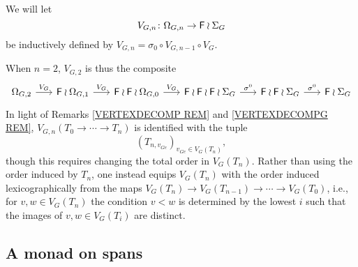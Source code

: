 \documentclass[a4paper,10pt]{article}%
\begin{document}
\begin{notation}\label{INDVNG NOT}
  We will let 
  \[
  V_{G,n} \colon \Omega_{G,n} \to \mathsf{F} \wr \Sigma_G
  \]
  be inductively defined by 
  $V_{G,n} = \sigma_0 \circ V_{G,n-1} \circ V_G$.
\end{notation}

\begin{remark}
  When $n = 2$, $V_{G,2}$ is thus the composite
  \[
  \begin{tikzcd}[column sep =1.7em]
    \Omega_{G,2} \ar{r}{V_G} &
    \Fin \wr \Omega_{G,1} \ar{r}{V_G} &
    \Fin \wr \Fin \wr \Omega_{G,0} \ar{r}{V_G} &
    \Fin \wr \Fin \wr \Fin \wr \Sigma_{G} \ar{r}{\sigma^0} &
    \Fin \wr \Fin \wr \Sigma_{G} \ar{r}{\sigma^0} &
    \Fin \wr \Sigma_{G}
  \end{tikzcd}
  \]
  In light of Remarks \ref{VERTEXDECOMP REM} and \ref{VERTEXDECOMPG REM}, 
  $V_{G,n}(T_0 \to \cdots \to T_n)$ is identified with the tuple 
  \begin{equation}\label{VGNISO EQ}
    (T_{n,v_{G e}})_{v_{G e} \in V_G(T_n)},
  \end{equation}
  though this requires changing the total order in $V_G(T_n)$. Rather than using the order induced by $T_n$, one instead equips 
  $V_G(T_n)$ with the order induced lexicographically
  from the maps 
  $V_G(T_n) \to V_G(T_{n-1}) \to \cdots \to V_G(T_0)$, i.e., for 
  $v,w \in V_G(T_n)$ the condition $v<w$ is determined by the lowest $i$ such that the images of $v,w \in V_G(T_i)$ are distinct.
\end{remark}




\subsection{A monad on spans}
\end{document}
